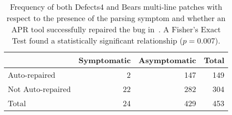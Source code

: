 \begin{table}
{\begin{center}
	\begin{tabular}{l | rr | r}
            	\toprule
            	& Symptomatic & Asymptomatic & Total \\
            	\midrule
            	Auto-repaired & 2 & 147 & 149 \\
            	Not Auto-repaired & 22 & 282 & 304 \\
            	\midrule
            	Total & 24 & 429 & 453\\
            	\bottomrule
	\end{tabular}
 \end{center}
}
	\caption{Frequency of both Defects4 and Bears multi-line patches with respect to the presence of
	the parsing symptom and whether an APR tool successfully
	repaired the bug in~\cite{durieux-repair-them-all}.
	A Fisher's Exact Test found a statistically significant relationship
	($p = 0.007$).}
	\label{tab:parsing-repair-frequencies-bears}
\end{table}
